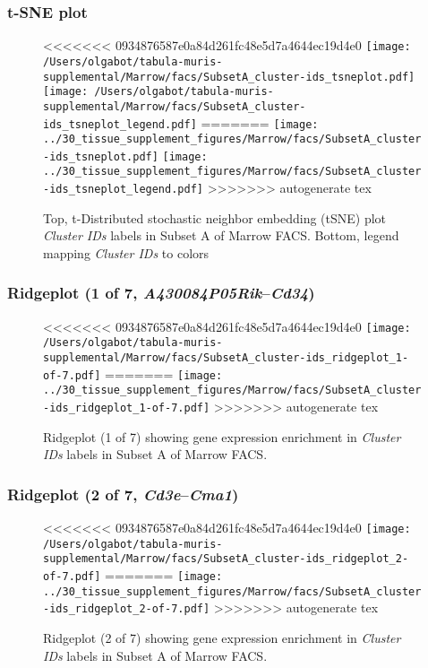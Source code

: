 \clearpage
\subsubsection{t-SNE plot}
\begin{figure}[h]
\centering
<<<<<<< 0934876587e0a84d261fc48e5d7a4644ec19d4e0
\texttt{[image: /Users/olgabot/tabula-muris-supplemental/Marrow/facs/SubsetA\_cluster-ids\_tsneplot.pdf]}
\texttt{[image: /Users/olgabot/tabula-muris-supplemental/Marrow/facs/SubsetA\_cluster-ids\_tsneplot\_legend.pdf]}
=======
\texttt{[image: ../30\_tissue\_supplement\_figures/Marrow/facs/SubsetA\_cluster-ids\_tsneplot.pdf]}
\texttt{[image: ../30\_tissue\_supplement\_figures/Marrow/facs/SubsetA\_cluster-ids\_tsneplot\_legend.pdf]}
>>>>>>> autogenerate tex
\caption{Top, t-Distributed stochastic neighbor embedding (tSNE) plot  \emph{Cluster IDs} labels in Subset A of Marrow FACS. Bottom, legend mapping \emph{Cluster IDs} to colors}
\end{figure}


\clearpage

\subsubsection{Ridgeplot (1 of 7, \emph{A430084P05Rik}--\emph{Cd34})}
\begin{figure}[h]
\centering
<<<<<<< 0934876587e0a84d261fc48e5d7a4644ec19d4e0
\texttt{[image: /Users/olgabot/tabula-muris-supplemental/Marrow/facs/SubsetA\_cluster-ids\_ridgeplot\_1-of-7.pdf]}
=======
\texttt{[image: ../30\_tissue\_supplement\_figures/Marrow/facs/SubsetA\_cluster-ids\_ridgeplot\_1-of-7.pdf]}
>>>>>>> autogenerate tex

\caption{ Ridgeplot (1 of 7)  showing gene expression enrichment in \emph{Cluster IDs} labels in Subset A of Marrow FACS. }
\end{figure}


\clearpage

\subsubsection{Ridgeplot (2 of 7, \emph{Cd3e}--\emph{Cma1})}
\begin{figure}[h]
\centering
<<<<<<< 0934876587e0a84d261fc48e5d7a4644ec19d4e0
\texttt{[image: /Users/olgabot/tabula-muris-supplemental/Marrow/facs/SubsetA\_cluster-ids\_ridgeplot\_2-of-7.pdf]}
=======
\texttt{[image: ../30\_tissue\_supplement\_figures/Marrow/facs/SubsetA\_cluster-ids\_ridgeplot\_2-of-7.pdf]}
>>>>>>> autogenerate tex

\caption{ Ridgeplot (2 of 7)  showing gene expression enrichment in \emph{Cluster IDs} labels in Subset A of Marrow FACS. }
\end{figure}


